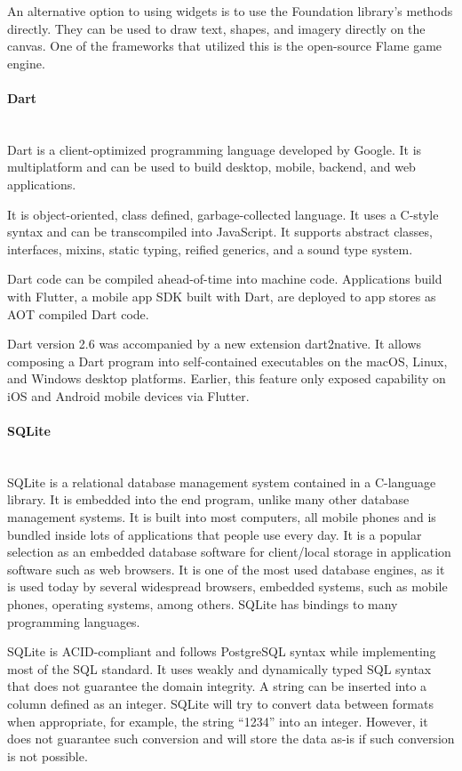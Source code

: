 An alternative option to using widgets is to use the Foundation library's methods directly. They can be used to draw text, shapes, and imagery directly on the canvas. One of the frameworks that utilized this is the open-source Flame game engine.

\paragraph{\large{Dart}}\mbox{}\\[2pt]
Dart is a client-optimized programming language developed by Google. It is multiplatform and can be used to build desktop, mobile, backend, and web applications.

It is object-oriented, class defined, garbage-collected language. It uses a C-style syntax and can be transcompiled into JavaScript. It supports abstract classes, interfaces, mixins, static typing, reified generics, and a sound type system.

Dart code can be compiled ahead-of-time into machine code. Applications build with Flutter, a mobile app SDK built with Dart, are deployed to app stores as AOT compiled Dart code.

Dart version 2.6 was accompanied by a new extension dart2native. It allows composing a Dart program into self-contained executables on the macOS, Linux, and Windows desktop platforms. Earlier, this feature only exposed capability on iOS and Android mobile devices via Flutter.~\cite{dart-wiki}

\paragraph{\large{SQLite}}\mbox{}\\[2pt]
SQLite is a relational database management system contained in a C-language library. It is embedded into the end program, unlike many other database management systems. It is built into most computers, all mobile phones and is bundled inside lots of applications that people use every day. It is a popular selection as an embedded database software for client/local storage in application software such as web browsers. It is one of the most used database engines, as it is used today by several widespread browsers, embedded systems, such as mobile phones, operating systems, among others. SQLite has bindings to many programming languages.

SQLite is ACID-compliant and follows PostgreSQL syntax while implementing most of the SQL standard. It uses weakly and dynamically typed SQL syntax that does not guarantee the domain integrity. A string can be inserted into a column defined as an integer. SQLite will try to convert data between formats when appropriate, for example, the string ``1234'' into an integer. However, it does not guarantee such conversion and will store the data as-is if such conversion is not possible.~\cite{sqlite-wiki}

